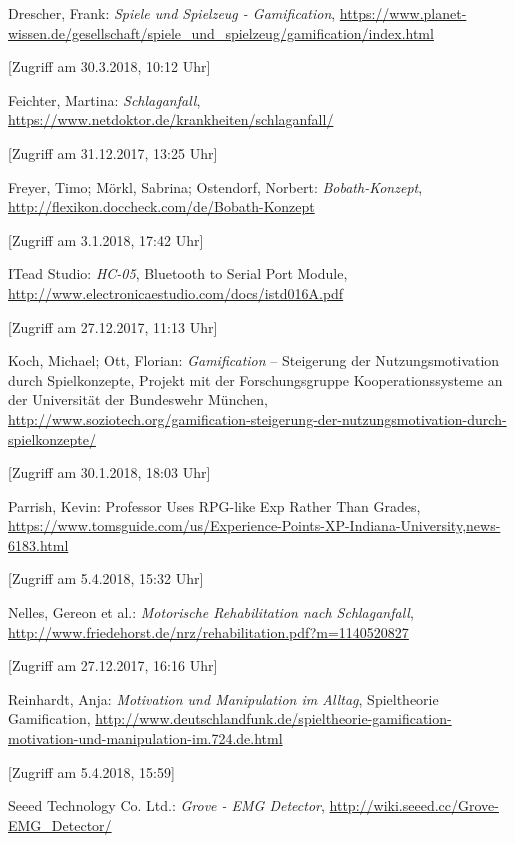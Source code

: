 \begin{thebibliography}{xxxxxx}
 Drescher, Frank: \textit{Spiele und Spielzeug - Gamification}, \url{https://www.planet-wissen.de/gesellschaft/spiele_und_spielzeug/gamification/index.html}

[Zugriff am 30.3.2018, 10:12 Uhr]

 Feichter, Martina: \textit{Schlaganfall}, \url{https://www.netdoktor.de/krankheiten/schlaganfall/}

[Zugriff am 31.12.2017, 13:25 Uhr]

 Freyer, Timo; Mörkl, Sabrina; Ostendorf, Norbert: \textit{Bobath-Konzept}, \url{http://flexikon.doccheck.com/de/Bobath-Konzept}

[Zugriff am 3.1.2018, 17:42 Uhr]

 ITead Studio: \textit{HC-05}, Bluetooth to Serial Port Module, \url{http://www.electronicaestudio.com/docs/istd016A.pdf}

[Zugriff am 27.12.2017, 11:13 Uhr]

 Koch, Michael; Ott, Florian: \textit{Gamification} – Steigerung der Nutzungsmotivation durch Spielkonzepte, Projekt mit der Forschungsgruppe Kooperationssysteme an der Universität der Bundeswehr München, \url{http://www.soziotech.org/gamification-steigerung-der-nutzungsmotivation-durch-spielkonzepte/}

[Zugriff am 30.1.2018, 18:03 Uhr]

 Parrish, Kevin: Professor Uses RPG-like Exp Rather Than Grades, \url{https://www.tomsguide.com/us/Experience-Points-XP-Indiana-University,news-6183.html}

[Zugriff am 5.4.2018, 15:32 Uhr]

 Nelles, Gereon et al.: \textit{Motorische Rehabilitation nach Schlaganfall}, \url{http://www.friedehorst.de/nrz/rehabilitation.pdf?m=1140520827}

[Zugriff am 27.12.2017, 16:16 Uhr]

 Reinhardt, Anja: \textit{Motivation und Manipulation im Alltag}, Spieltheorie \glqq Gamification\grqq , \url{http://www.deutschlandfunk.de/spieltheorie-gamification-motivation-und-manipulation-im.724.de.html}

[Zugriff am 5.4.2018, 15:59]

 Seeed Technology Co. Ltd.: \textit{Grove - EMG Detector}, \url{http://wiki.seeed.cc/Grove-EMG_Detector/}


\end{thebibliography}

